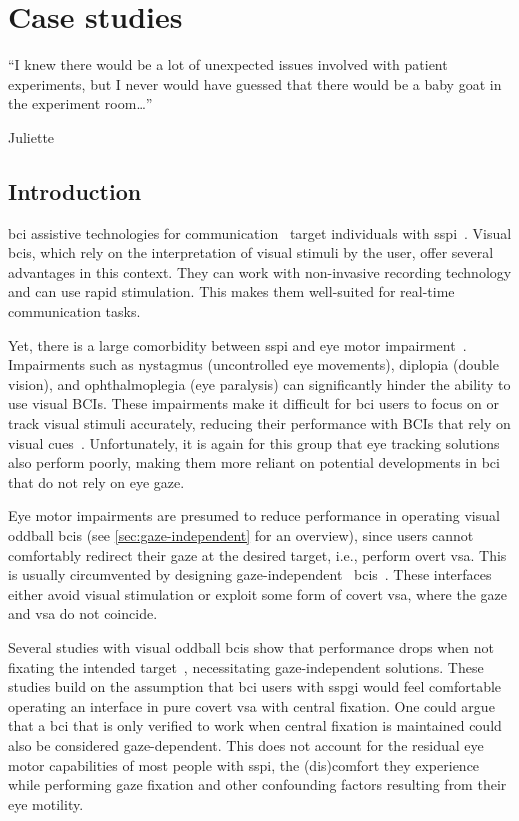 \chapter{Case studies}
\label{sec:patients}
\epigraph{``I knew there would be a lot of unexpected issues involved with
patient experiments, but I never would have guessed that there would be a baby
goat in the experiment room\ldots''}{Juliette}

\section{Introduction}

\Ac{bci} assistive technologies for communication~\cite{Millan2010}
target individuals with \acf{sspi}~\cite{Peters2022}.
Visual \acp{bci}, which rely on the interpretation of visual stimuli by the user,
offer several advantages in this context.
They can work with non-invasive recording technology and can use rapid
stimulation.
This makes them well-suited for real-time communication tasks.

Yet, there is a large comorbidity between \ac{sspi} and eye motor impairment~\cite{FriedOken2020}.
Impairments such as nystagmus (uncontrolled eye movements), diplopia (double
vision), and ophthalmoplegia (eye paralysis) can significantly hinder
the ability to use visual BCIs. These impairments make it difficult for
\ac{bci} users to focus on or track visual stimuli accurately, reducing their
performance with BCIs that rely on visual cues~\cite{McCane2014,FriedOken2020,Pasqualotto2015}.
Unfortunately, it is again for this group that eye tracking solutions also
perform poorly, making them more reliant on potential developments in \ac{bci}
that do not rely on eye gaze.

Eye motor impairments are presumed to reduce performance in operating visual
oddball \ac{bci}s (see \cref{sec:gaze-independent} for an overview), since users
cannot comfortably redirect their gaze at the desired target,
i.e., perform overt \ac{vsa}.
This is usually circumvented by designing gaze-independent~
\acp{bci}~\cite{Riccio2012}.
These interfaces either avoid visual stimulation or exploit some form of
covert \ac{vsa}, where the gaze and \ac{vsa} do not coincide.

Several studies with visual oddball \acp{bci} show that performance drops when not fixating the intended
target~\cite{Brunner2010, Treder2010, RonAngevin2019}, necessitating
gaze-in\-de\-pen\-dent solutions.
These studies build on the assumption that \ac{bci} users with \ac{sspgi}
would feel comfortable operating an interface in pure covert \ac{vsa} with
central fixation.
One could argue that a \ac{bci} that is only verified to work when central
fixation is maintained could also be considered gaze-dependent.
This does not account for the residual eye motor capabilities of most people
with \ac{sspi}, the (dis)comfort they experience while
performing gaze fixation and other confounding factors resulting from their eye
motility.

